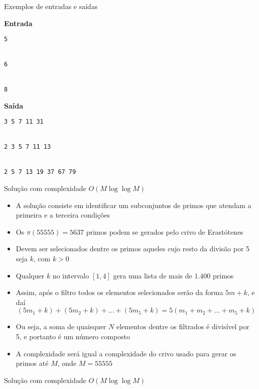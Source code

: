 \begin{frame}[fragile]{Exemplos de entradas e saídas}

\begin{minipage}[t]{0.45\textwidth}
\textbf{Entrada}
\begin{verbatim}
5


6


8
\end{verbatim}
\end{minipage}
\begin{minipage}[t]{0.5\textwidth}
\textbf{Saída}
\begin{verbatim}
3 5 7 11 31


2 3 5 7 11 13


2 5 7 13 19 37 67 79
\end{verbatim}
\end{minipage}
\end{frame}


\begin{frame}[fragile]{Solução com complexidade $O(M\log \log M)$}

    \begin{itemize}
        \item A solução consiste em identificar um subconjuntos de primos que atendam a primeira
            e a terceira condições

        \item Os $\pi(55555) = 5637$ primos podem se gerados pelo crivo de Erastótenes

        \item Devem ser selecionados dentre os primos aqueles cujo resto da divisão por 5 seja
            $k$, com $k > 0$

        \item Qualquer $k$ no intervalo $[1, 4]$ gera uma lista de mais de $1.400$ primos

        \item Assim, após o filtro todos os elementos selecionados serão da forma $5m + k$, e 
            daí
        $$
            (5m_1 + k) + (5m_2 + k) + \ldots + (5m_5 + k) = 5(m_1 + m_2 + \ldots + m_5 + k)
        $$

        \item Ou seja, a soma de quaisquer $N$ elementos dentre os filtrados é 
            divisível por 5, e portanto é um número composto

        \item A complexidade será igual a complexidade do crivo usado para gerar os primos até
            $M$, onde $M = 55555$
    \end{itemize}

\end{frame}

\begin{frame}[fragile]{Solução com complexidade $O(M\log \log M)$}
\end{frame}
